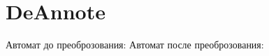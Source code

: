 \section{DeAnnote}
\begin{frame}{}
	Автомат до преоброзования:
	Автомат после преоброзования:
\end{frame}

